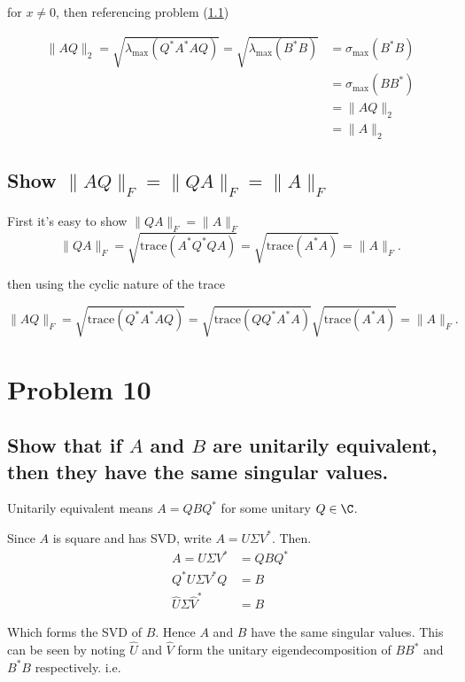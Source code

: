 for $x \neq 0$, then referencing problem (\ref{sub:10.1})

  \begin{align*}
    \|AQ\|_{2} = \sqrt{\lambda _{\text{max}} (Q^{*}A^{*}AQ)} = \sqrt{\lambda
    _{\text{max}} (B^{*}B)} &= \sigma_{\text{max}} (B^{*}B) \\
                            &= \sigma_{\text{max}} (BB^{*}) \\
                            &= \|AQ\|_{2} \\
                            &= \|A\|_{2}
  \end{align*}

\subsection{Show $\|AQ\|_{F} = \|QA\|_{F} = \|A\|_{F}$ }%
\label{sub:10.2}

First it's easy to show $\|QA\|_{F} = \|A\|_{F}$
\[
  \|QA\|_{F} = \sqrt{ \text{trace}(A^{*}Q^{*}QA)} =\sqrt{ \text{trace}(A^{*}A)}
  = \|A\|_{F}
.\] 

then using the cyclic nature of the trace

\[
  \|AQ\|_{F} = \sqrt{ \text{trace}(Q^{*}A^{*}AQ)} =\sqrt{ \text{trace}(QQ^{*}A^{*}A)}
   \sqrt{ \text{trace}(A^{*}A)} = \|A\|_{F}
.\] 


\section{Problem 10}%
\label{sec:problem_10}

\subsection{Show that if $A$ and $B$ are unitarily equivalent, then they have
the same singular values.}%
\label{sub:10.1}
Unitarily equivalent means $A = QBQ^{*}$ for some unitary $Q\in\C$.

Since $A$ is square and has SVD, write $A=U\Sigma V^*$. Then.
  \begin{align*}
    A = U\Sigma V^* &= QBQ^* \\
    Q^*U\Sigma V^*Q &= B \\
    \hat U\Sigma \hat V^* &= B
  \end{align*}

  Which forms the SVD of $B$. Hence $A$ and $B$ have the same singular
  values. This can be seen by noting $\hat U$ and $\hat V$ form the
  unitary eigendecomposition of  $BB^*$ and $B^*B$ respectively. i.e.


